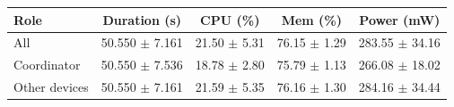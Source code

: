 \begin{tabular}{lcccc}
\hline
\textbf{Role} & \textbf{Duration (s)} & \textbf{CPU (\%)} & \textbf{Mem (\%)} & \textbf{Power (mW)} \\
\hline
All & 50.550 $\pm$ 7.161 & 21.50 $\pm$ 5.31 & 76.15 $\pm$ 1.29 & 283.55 $\pm$ 34.16 \\
Coordinator & 50.550 $\pm$ 7.536 & 18.78 $\pm$ 2.80 & 75.79 $\pm$ 1.13 & 266.08 $\pm$ 18.02 \\
Other devices & 50.550 $\pm$ 7.161 & 21.59 $\pm$ 5.35 & 76.16 $\pm$ 1.30 & 284.16 $\pm$ 34.44 \\
\hline
\end{tabular}

